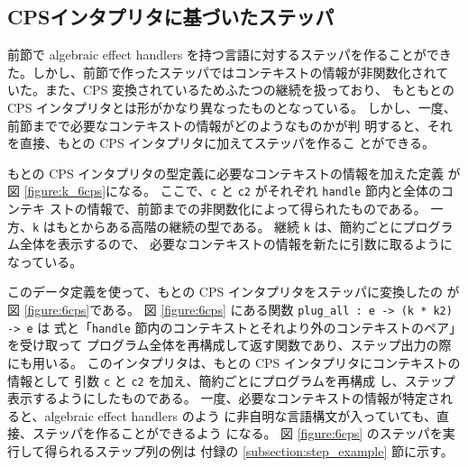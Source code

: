 \subsection{CPSインタプリタに基づいたステッパ}

前節で algebraic effect handlers を持つ言語に対するステッパを作ることができ
た。しかし、前節で作ったステッパではコンテキストの情報が非関数化されて
いた。また、CPS 変換されているためふたつの継続を扱っており、
もともとの CPS インタプリタとは形がかなり異なったものとなっている。
しかし、一度、前節までで必要なコンテキストの情報がどのようなものかが判
明すると、それを直接、もとの CPS インタプリタに加えてステッパを作るこ
とができる。

もとの CPS インタプリタの型定義に必要なコンテキストの情報を加えた定義
が図 \ref{figure:k_6cps}になる。
ここで、\texttt{c} と \texttt{c2} がそれぞれ \texttt{handle} 節内と全体のコンテキ
ストの情報で、前節までの非関数化によって得られたものである。
一方、\texttt{k} はもとからある高階の継続の型である。
継続 \texttt{k} は、簡約ごとにプログラム全体を表示するので、
必要なコンテキストの情報を新たに引数に取るようになっている。

このデータ定義を使って、もとの CPS インタプリタをステッパに変換したの
が図 \ref{figure:6cps}である。
図 \ref{figure:6cps} にある関数 \texttt{plug\_all :\ e -> (k * k2) -> e} は
式と「\texttt{handle} 節内のコンテキストとそれより外のコンテキストのペア」を受け取って
プログラム全体を再構成して返す関数であり、ステップ出力の際にも用いる。
このインタプリタは、もとの CPS インタプリタにコンテキストの情報として
引数 \texttt{c} と \texttt{c2} を加え、簡約ごとにプログラムを再構成
し、ステップ表示するようにしたものである。
一度、必要なコンテキストの情報が特定されると、algebraic effect handlers のよう
に非自明な言語構文が入っていても、直接、ステッパを作ることができるよう
になる。
図 \ref{figure:6cps} のステッパを実行して得られるステップ列の例は
付録の \ref{subsection:step_example} 節に示す。
